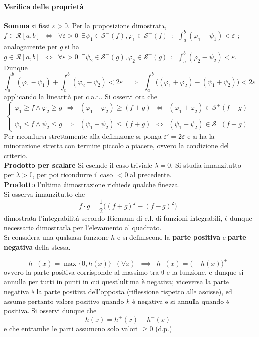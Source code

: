 \documentclass[10pt]{article}
\theoremstyle{plain}
\begin{document}
\paragraph*{Verifica delle proprietà}
\textbf{Somma} si fissi $\varepsilon > 0$. Per la proposizione dimostrata, $f \in \mathcal{R}[a,b] \enspace \Leftrightarrow \enspace \forall \varepsilon > 0 \enspace \exists \psi_1 \in \mathcal{S}^-(f) , \varphi_1 \in \mathcal{S}^+(f) \enspace : \enspace \int_a^b (\varphi_1 - \psi_1) < \varepsilon$ ; analogamente per $g$ si ha $g \in \mathcal{R}[a,b] \enspace \Leftrightarrow \enspace \forall \varepsilon > 0 \enspace \exists \psi_2 \in \mathcal{S}^-(g) , \varphi_2 \in \mathcal{S}^+(g) \enspace : \enspace \int_a^b (\varphi_2 - \psi_2) < \varepsilon$. Dunque 
\[\int_a^b (\varphi_1 - \psi_1) + \int_a^b (\varphi_2 - \psi_2) < 2\varepsilon \enspace \implies \enspace \int_a^b \big((\varphi_1 + \varphi_2) - (\psi_1 + \psi_2)\big) < 2\varepsilon\]
applicando la linearità per c.a.t.. Si osservi ora che 
\[\begin{cases}
    \varphi_1 \geq f \land \varphi_2 \geq g \enspace \Rightarrow \enspace (\varphi_1 + \varphi_2) \geq (f+g) \enspace \Leftrightarrow \enspace (\varphi_1 + \varphi_2) \in \mathcal{S}^+(f+g)\\
\\
    \psi_1 \leq f \land \psi_2 \leq g \enspace \Rightarrow \enspace (\psi_1 + \psi_2) \leq (f+g) \enspace \Leftrightarrow \enspace (\psi_1 + \psi_2) \in \mathcal{S}^-(f+g)
\end{cases}\]
Per ricondursi strettamente alla definizione si ponga $\varepsilon' = 2\varepsilon$ e si ha la minorazione stretta con termine piccolo a piacere, ovvero la condizione del criterio.
\\\textbf{Prodotto per scalare} Si esclude il caso triviale $\lambda = 0$. Si studia innanzitutto per $\lambda > 0$, per poi ricondurre il caso $< 0$ al precedente.
\\\textbf{Prodotto} l'ultima dimostrazione richiede qualche finezza.
\\Si osserva innanzitutto che 
\[f \cdot g = \frac{1}{2}\big((f+g)^2 - (f-g)^2\big)\]
dimostrata l'integrabilità secondo Riemann di c.l. di funzioni integrabili, è dunque necessario dimostrarla per l'elevamento al quadrato.
\\Si considera una qualsiasi funzione $h$ e si definiscono la \textbf{parte positiva} e \textbf{parte negativa} della stessa.
\begin{defin}
\[h^+(x) = \max\{0, h(x)\} \enspace (\forall x) \enspace \implies \enspace h^-(x) = \big(-h(x)\big)^+\]
ovvero la parte positiva corrisponde al massimo tra 0 e la funzione, e dunque si annulla per tutti in punti in cui quest'ultima è negativa; viceversa la parte negativa è la parte positiva dell'opposta (riflessione rispetto alle ascisse), ed assume pertanto valore positivo quando $h$ è negativa e si annulla quando è positiva. Si osservi dunque che
\[h(x) = h^+(x) - h^-(x)\]
e che entrambe le parti assumono solo valori $\geq 0$ (d.p.)
\end{defin}
\end{document}
